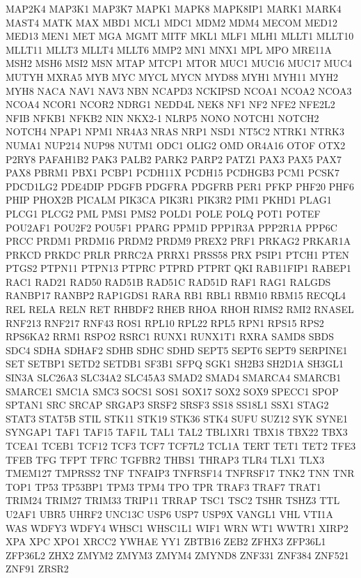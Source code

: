 \documentclass[8pt,letterpaper]{extarticle}
\begin{document}
{MAP2K4 MAP3K1 MAP3K7 MAPK1 MAPK8 MAPK8IP1 MARK1 MARK4 MAST4 MATK MAX MBD1 MCL1 MDC1 MDM2 MDM4 MECOM MED12 MED13 MEN1 MET MGA MGMT MITF MKL1 MLF1 MLH1 MLLT1 MLLT10 MLLT11 MLLT3 MLLT4 MLLT6 MMP2 MN1 MNX1 MPL MPO MRE11A MSH2 MSH6 MSI2 MSN MTAP MTCP1 MTOR MUC1 MUC16 MUC17 MUC4 MUTYH
MXRA5 MYB MYC MYCL MYCN MYD88 MYH1 MYH11 MYH2 MYH8 NACA NAV1 NAV3 NBN NCAPD3 NCKIPSD NCOA1 NCOA2 NCOA3 NCOA4 NCOR1 NCOR2 NDRG1 NEDD4L NEK8 NF1 NF2 NFE2 NFE2L2 NFIB NFKB1 NFKB2 NIN NKX2-1 NLRP5 NONO NOTCH1 NOTCH2 NOTCH4 NPAP1 NPM1 NR4A3 NRAS NRP1 NSD1 NT5C2 NTRK1 NTRK3 NUMA1 NUP214 NUP98
NUTM1 ODC1 OLIG2 OMD OR4A16 OTOF OTX2 P2RY8 PAFAH1B2 PAK3 PALB2 PARK2 PARP2 PATZ1 PAX3 PAX5 PAX7 PAX8 PBRM1 PBX1 PCBP1 PCDH11X PCDH15 PCDHGB3 PCM1 PCSK7 PDCD1LG2 PDE4DIP PDGFB PDGFRA PDGFRB PER1 PFKP PHF20 PHF6 PHIP PHOX2B PICALM PIK3CA PIK3R1 PIK3R2 PIM1 PKHD1 PLAG1 PLCG1 PLCG2 PML PMS1 PMS2
POLD1 POLE POLQ POT1 POTEF POU2AF1 POU2F2 POU5F1 PPARG PPM1D PPP1R3A PPP2R1A PPP6C PRCC PRDM1 PRDM16 PRDM2 PRDM9 PREX2 PRF1 PRKAG2 PRKAR1A PRKCD PRKDC PRLR PRRC2A PRRX1 PRSS58 PRX PSIP1 PTCH1 PTEN PTGS2 PTPN11 PTPN13 PTPRC PTPRD PTPRT QKI RAB11FIP1 RABEP1 RAC1 RAD21 RAD50 RAD51B RAD51C RAD51D RAF1 RAG1 RALGDS
RANBP17 RANBP2 RAP1GDS1 RARA RB1 RBL1 RBM10 RBM15 RECQL4 REL RELA RELN RET RHBDF2 RHEB RHOA RHOH RIMS2 RMI2 RNASEL RNF213 RNF217 RNF43 ROS1 RPL10 RPL22 RPL5 RPN1 RPS15 RPS2 RPS6KA2 RRM1 RSPO2 RSRC1 RUNX1 RUNX1T1 RXRA SAMD8 SBDS SDC4 SDHA SDHAF2 SDHB SDHC SDHD SEPT5 SEPT6 SEPT9 SERPINE1 SET SETBP1
SETD2 SETDB1 SF3B1 SFPQ SGK1 SH2B3 SH2D1A SH3GL1 SIN3A SLC26A3 SLC34A2 SLC45A3 SMAD2 SMAD4 SMARCA4 SMARCB1 SMARCE1 SMC1A SMC3 SOCS1 SOS1 SOX17 SOX2 SOX9 SPECC1 SPOP SPTAN1 SRC SRCAP SRGAP3 SRSF2 SRSF3 SS18 SS18L1 SSX1 STAG2 STAT3 STAT5B STIL STK11 STK19 STK36 STK4 SUFU SUZ12 SYK SYNE1 SYNGAP1 TAF1
TAF15 TAF1L TAL1 TAL2 TBL1XR1 TBX18 TBX22 TBX3 TCEA1 TCEB1 TCF12 TCF3 TCF7 TCF7L2 TCL1A TERT TET1 TET2 TFE3 TFEB TFG TFPT TFRC TGFBR2 THBS1 THRAP3 TLR4 TLX1 TLX3 TMEM127 TMPRSS2 TNF TNFAIP3 TNFRSF14 TNFRSF17 TNK2 TNN TNR TOP1 TP53 TP53BP1 TPM3 TPM4 TPO TPR TRAF3 TRAF7 TRAT1 TRIM24 TRIM27 TRIM33
TRIP11 TRRAP TSC1 TSC2 TSHR TSHZ3 TTL U2AF1 UBR5 UHRF2 UNC13C USP6 USP7 USP9X VANGL1 VHL VTI1A WAS WDFY3 WDFY4 WHSC1 WHSC1L1 WIF1 WRN WT1 WWTR1 XIRP2 XPA XPC XPO1 XRCC2 YWHAE YY1 ZBTB16 ZEB2 ZFHX3 ZFP36L1 ZFP36L2 ZHX2 ZMYM2 ZMYM3 ZMYM4 ZMYND8 ZNF331 ZNF384 ZNF521 ZNF91 ZRSR2
}
\end{document}
